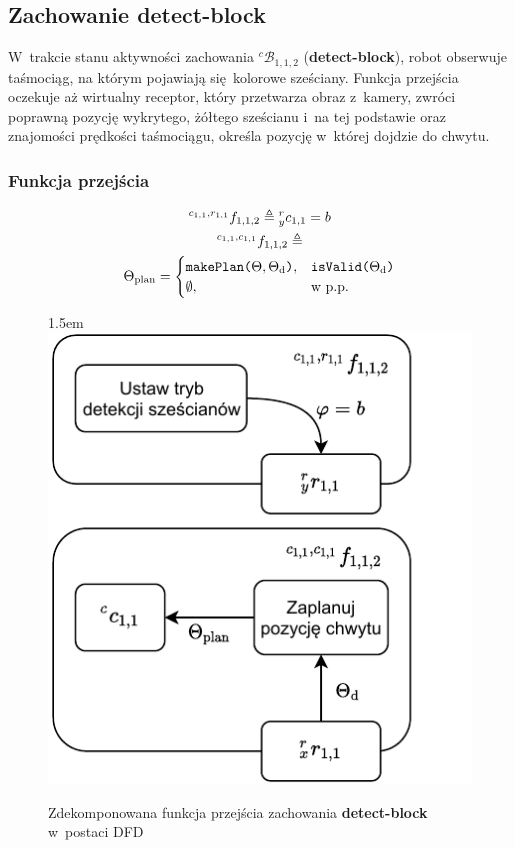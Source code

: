 \subsection{Zachowanie detect-block}
\label{subsec:cs-detect-block}
W~trakcie stanu aktywności zachowania ${}^{c}\mathcal{B}_{1,1,2}$ (\textbf{detect-block}), robot obserwuje taśmociąg, na którym pojawiają się kolorowe sześciany. Funkcja przejścia oczekuje aż wirtualny receptor, który przetwarza obraz z~kamery, zwróci poprawną pozycję wykrytego, żółtego sześcianu i~na tej podstawie oraz znajomości prędkości taśmociągu, określa pozycję w~której dojdzie do chwytu.

\subsubsection{Funkcja przejścia}
\begin{equation}
    \begin{gathered}
      {}^{c_{1,1}, r_{1,1}}f_{1,1,2} \triangleq {}^{r}_{y}c_{1,1} = b\\        
      {}^{c_{1,1}, c_{1,1}}f_{1,1,2} \triangleq \\ \Theta_{\mathrm{plan}} =
                   \begin{cases}
       			    \text{\texttt{makePlan($\Theta, \Theta_{\mathrm{d}}$)}}, & \text{\texttt{isValid($\Theta_{\mathrm{d}}$)}}\\
                       \emptyset, & \text{w p.p.}
       		    \end{cases}
    \end{gathered}
\end{equation}

\begin{figure}[ht]
    \leftskip1.5em
    \includegraphics[width=\columnwidth]{figures/ISR-cs-fp-detect-block.pdf}
    \caption{Zdekomponowana funkcja przejścia zachowania \textbf{detect-block} w~postaci DFD}
    \label{fig:cs-fp-detect-block}
\end{figure}

